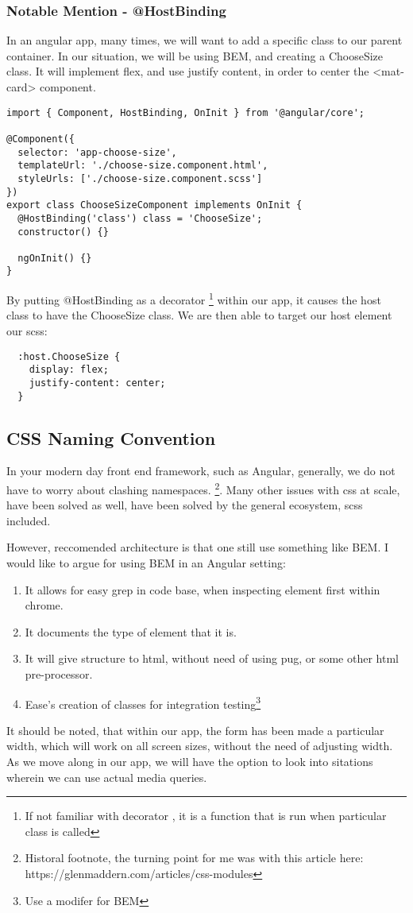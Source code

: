 \subsubsection{ Notable Mention - @HostBinding }
In an angular app, many times, we will want to add a specific class to our
parent container. In our situation, we will be using BEM, and creating a
ChooseSize class. It will implement flex, and use justify content, in order to
center the <mat-card> component.

\begin{lstlisting}[caption=My Javascript Example]
import { Component, HostBinding, OnInit } from '@angular/core';

@Component({
  selector: 'app-choose-size',
  templateUrl: './choose-size.component.html',
  styleUrls: ['./choose-size.component.scss']
})
export class ChooseSizeComponent implements OnInit {
  @HostBinding('class') class = 'ChooseSize';
  constructor() {}

  ngOnInit() {}
}
\end{lstlisting}

By putting @HostBinding as a decorator \footnote{If not familiar with decorator
, it is a function that is run when particular class is called} within our app,
it causes the host class to have the ChooseSize class. We are then able to
target our host element our scss:
\begin{verbatim}
  :host.ChooseSize {
    display: flex;
    justify-content: center;
  }
\end{verbatim}

\subsection{ CSS Naming Convention }
In your modern day front end framework, such as Angular, generally, we do not
have to worry about clashing namespaces. \footnote{Historal footnote, the
turning point for me was with this article here:
https://glenmaddern.com/articles/css-modules}. Many other issues with css at
scale, have been solved as well, have been solved by the general ecosystem, scss
included.

However, reccomended architecture is that one still use something like BEM. I
would like to argue for using BEM in an Angular setting:
\begin{enumerate}
  \item It allows for easy grep in code base, when inspecting element first
  within chrome.
  \item It documents the type of element that it is.
  \item It will give structure to html, without need of using pug, or some other
  html pre-processor.
  \item Ease's creation of classes for integration testing\footnote{Use a modifer
  for BEM}
\end{enumerate}

It should be noted, that within our app, the form has been made a particular
width, which will work on all screen sizes, without the need of adjusting width.
As we move along in our app, we will have the option to look into sitations
wherein we can use actual media queries.
